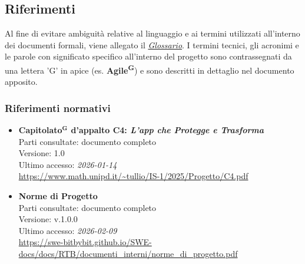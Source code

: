\documentclass[a4paper,12pt]{article}
\newcommand{\term}[1]{\textbf{#1}$^\mathbf{G}$}
\begin{document}

\subsection{Riferimenti} \label{sec:riferimenti}



Al fine di evitare ambiguità relative al linguaggio e ai termini utilizzati all'interno dei documenti formali, viene allegato il \href{https://swe-bitbybit.github.io/SWE-docs/docs/RTB/documenti_interni/Glossario.pdf}{\textit{Glossario}}.
I termini tecnici, gli acronimi e le parole con significato specifico all'interno del progetto sono contrassegnati da una lettera 'G' in apice (es. \textbf{Agile\textsuperscript{G}}) e sono descritti in dettaglio nel documento apposito.

\subsubsection{Riferimenti normativi}\label{sec:riferimenti_normativi}
\begin{itemize}
\item \textbf{\term{Capitolato} d'appalto C4: \emph{L'app che Protegge e Trasforma}}\\
Parti consultate: documento completo\\
Versione: 1.0\\
Ultimo accesso: \textit{2026-01-14}\\
\url{https://www.math.unipd.it/~tullio/IS-1/2025/Progetto/C4.pdf}

\item \textbf{Norme di Progetto}\\
Parti consultate: documento completo\\
Versione: v.1.0.0\\
Ultimo accesso: \textit{2026-02-09}\\
\url{https://swe-bitbybit.github.io/SWE-docs/docs/RTB/documenti_interni/norme_di_progetto.pdf}
\end{itemize}
\end{document}
